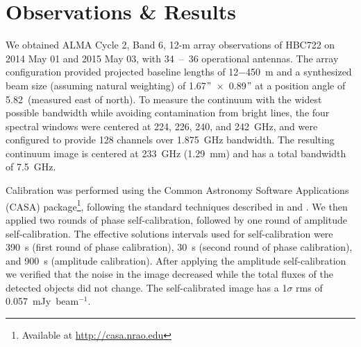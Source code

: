 \documentclass{aastex63}
\begin{document}
\section{Observations \& Results}\label{sec_obs}
We obtained ALMA Cycle 2, Band 6, 12-m array observations of HBC722 on 2014 May 01 and 2015 May 03, with 34~--~36 operational antennas.  The array configuration provided projected baseline lengths of 12$-$450~m and a synthesized beam size (assuming natural weighting) of 1.67$"$~$\times$~0.89$"$ at a position angle of 5.82\degree\ (measured east of north).  %
To measure the continuum with the widest possible bandwidth while avoiding contamination from bright lines, the four spectral windows were centered at 224, 226, 240, and 242~GHz, and were configured to provide 128 channels over 1.875~GHz bandwidth.
The resulting continuum image is centered at 233~GHz (1.29~mm) and has a total bandwidth of 7.5~GHz.

Calibration was performed using the Common Astronomy Software Applications (CASA) package\footnote{Available at \href{http://casa.nrao.edu}{http://casa.nrao.edu}}, following the standard techniques described in \citet{petry2014:alma} and \citet{schnee2014:alma}.  We then applied two rounds of phase self-calibration, followed by one round of amplitude self-calibration.  The effective solutions intervals used for self-calibration were 390~s (first round of phase calibration), 30~s (second round of phase calibration), and 900~s (amplitude calibration).  After applying the amplitude self-calibration we verified that the noise in the image decreased while the total fluxes of the detected objects did not change.  The self-calibrated image has a 1$\sigma$ rms of 0.057~mJy~beam$^{-1}$.


\end{document}
